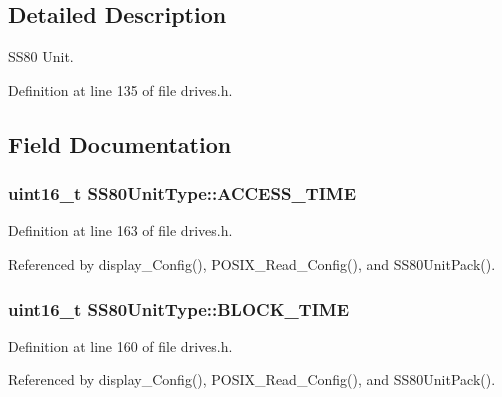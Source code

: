 \subsection{Detailed Description}
S\+S80 Unit. 

Definition at line 135 of file drives.\+h.



\subsection{Field Documentation}
\subsubsection[{\texorpdfstring{A\+C\+C\+E\+S\+S\+\_\+\+T\+I\+ME}{ACCESS_TIME}}]{\setlength{\rightskip}{0pt plus 5cm}uint16\+\_\+t S\+S80\+Unit\+Type\+::\+A\+C\+C\+E\+S\+S\+\_\+\+T\+I\+ME}\hypertarget{structSS80UnitType_ab43ef110f145d428fff831afc18f5e24}{}\label{structSS80UnitType_ab43ef110f145d428fff831afc18f5e24}


Definition at line 163 of file drives.\+h.



Referenced by display\+\_\+\+Config(), P\+O\+S\+I\+X\+\_\+\+Read\+\_\+\+Config(), and S\+S80\+Unit\+Pack().

\subsubsection[{\texorpdfstring{B\+L\+O\+C\+K\+\_\+\+T\+I\+ME}{BLOCK_TIME}}]{\setlength{\rightskip}{0pt plus 5cm}uint16\+\_\+t S\+S80\+Unit\+Type\+::\+B\+L\+O\+C\+K\+\_\+\+T\+I\+ME}\hypertarget{structSS80UnitType_ab94c4b75c74e08e128d4802f5dec0dd5}{}\label{structSS80UnitType_ab94c4b75c74e08e128d4802f5dec0dd5}


Definition at line 160 of file drives.\+h.



Referenced by display\+\_\+\+Config(), P\+O\+S\+I\+X\+\_\+\+Read\+\_\+\+Config(), and S\+S80\+Unit\+Pack().

